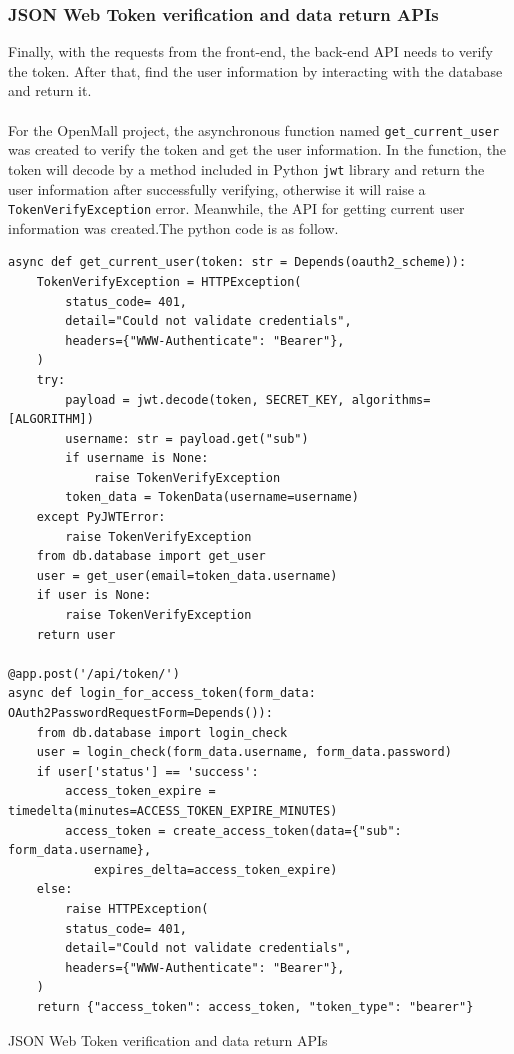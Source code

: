 \documentclass{article}
\begin{document}
\subsubsection{JSON Web Token verification and data return APIs}

Finally, with the requests from the front-end, the back-end API needs to verify the token. After that, find the user information by interacting with the database and return it.
\\\\
For the OpenMall project, the asynchronous function named \verb|get_current_user| was created to verify the token and get the user information. In the function, the token will decode by a method included in Python \verb|jwt| library and return the user information after successfully verifying, otherwise it will raise a \verb|TokenVerifyException| error. Meanwhile, the API for getting current user information was created.The python code is as follow.

\begin{listing}[!htp]
\begin{verbatim}
async def get_current_user(token: str = Depends(oauth2_scheme)):
    TokenVerifyException = HTTPException(
        status_code= 401,
        detail="Could not validate credentials",
        headers={"WWW-Authenticate": "Bearer"},
    )
    try:
        payload = jwt.decode(token, SECRET_KEY, algorithms=[ALGORITHM])
        username: str = payload.get("sub")
        if username is None:
            raise TokenVerifyException
        token_data = TokenData(username=username)
    except PyJWTError:
        raise TokenVerifyException
    from db.database import get_user
    user = get_user(email=token_data.username)
    if user is None:
        raise TokenVerifyException
    return user
	
@app.post('/api/token/')
async def login_for_access_token(form_data: OAuth2PasswordRequestForm=Depends()):
    from db.database import login_check
    user = login_check(form_data.username, form_data.password)
    if user['status'] == 'success':
        access_token_expire = timedelta(minutes=ACCESS_TOKEN_EXPIRE_MINUTES)
        access_token = create_access_token(data={"sub": form_data.username},
            expires_delta=access_token_expire)
    else:
        raise HTTPException(
        status_code= 401,
        detail="Could not validate credentials",
        headers={"WWW-Authenticate": "Bearer"},
    )
    return {"access_token": access_token, "token_type": "bearer"}

\end{verbatim}
\caption{JSON Web Token verification and data return APIs}
\label{JWT verification and data return}
\end{listing}
\end{document}
